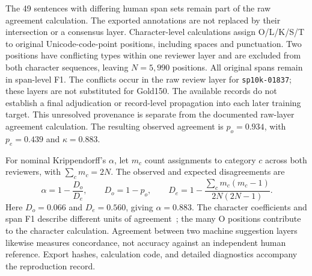 The 49 sentences with differing human span sets remain part of the raw agreement calculation. The exported annotations are not replaced by their intersection or a consensus layer. Character-level calculations assign O/L/K/S/T to original Unicode-code-point positions, including spaces and punctuation. Two positions have conflicting types within one reviewer layer and are excluded from both character sequences, leaving $N=5{,}990$ positions. All original spans remain in span-level F1. The conflicts occur in the raw review layer for \texttt{sp10k-01837}; these layers are not substituted for Gold150. The available records do not establish a final adjudication or record-level propagation into each later training target. This unresolved provenance is separate from the documented raw-layer agreement calculation. The resulting observed agreement is $p_o=0.934$, with $p_e=0.439$ and $\kappa=0.883$.

For nominal Krippendorff's $\alpha$, let $m_c$ count assignments to category $c$ across both reviewers, with $\sum_c m_c=2N$. The observed and expected disagreements are
\begin{equation}
\alpha=1-\frac{D_o}{D_e},\qquad
D_o=1-p_o,\qquad
D_e=1-\frac{\sum_c m_c(m_c-1)}{2N(2N-1)}.
\label{eq:qa150-alpha}
\end{equation}
Here $D_o=0.066$ and $D_e=0.560$, giving $\alpha=0.883$. The character coefficients and span F1 describe different units of agreement~\citep{artstein2008agreement}; the many O positions contribute to the character calculation. Agreement between two machine suggestion layers likewise measures concordance, not accuracy against an independent human reference. Export hashes, calculation code, and detailed diagnostics accompany the reproduction record.
\FloatBarrier
